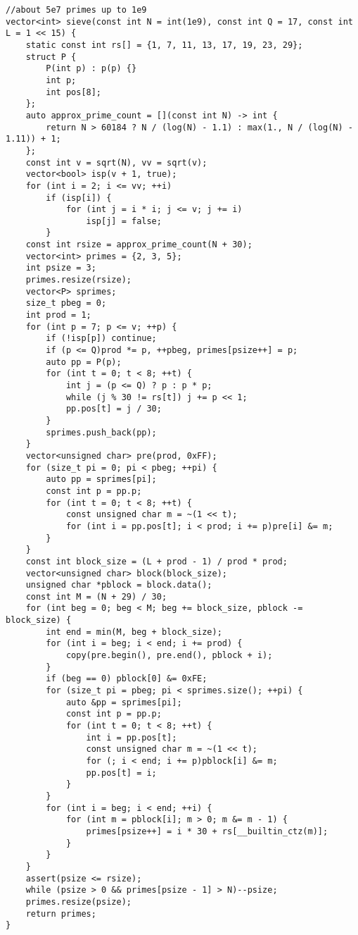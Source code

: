 \begin{lstlisting}[style=cpp]
//about 5e7 primes up to 1e9
vector<int> sieve(const int N = int(1e9), const int Q = 17, const int L = 1 << 15) {
    static const int rs[] = {1, 7, 11, 13, 17, 19, 23, 29};
    struct P {
        P(int p) : p(p) {}
        int p;
        int pos[8];
    };
    auto approx_prime_count = [](const int N) -> int {
        return N > 60184 ? N / (log(N) - 1.1) : max(1., N / (log(N) - 1.11)) + 1;
    };
    const int v = sqrt(N), vv = sqrt(v);
    vector<bool> isp(v + 1, true);
    for (int i = 2; i <= vv; ++i)
        if (isp[i]) {
            for (int j = i * i; j <= v; j += i)
                isp[j] = false;
        }
    const int rsize = approx_prime_count(N + 30);
    vector<int> primes = {2, 3, 5};
    int psize = 3;
    primes.resize(rsize);
    vector<P> sprimes;
    size_t pbeg = 0;
    int prod = 1;
    for (int p = 7; p <= v; ++p) {
        if (!isp[p]) continue;
        if (p <= Q)prod *= p, ++pbeg, primes[psize++] = p;
        auto pp = P(p);
        for (int t = 0; t < 8; ++t) {
            int j = (p <= Q) ? p : p * p;
            while (j % 30 != rs[t]) j += p << 1;
            pp.pos[t] = j / 30;
        }
        sprimes.push_back(pp);
    }
    vector<unsigned char> pre(prod, 0xFF);
    for (size_t pi = 0; pi < pbeg; ++pi) {
        auto pp = sprimes[pi];
        const int p = pp.p;
        for (int t = 0; t < 8; ++t) {
            const unsigned char m = ~(1 << t);
            for (int i = pp.pos[t]; i < prod; i += p)pre[i] &= m;
        }
    }
    const int block_size = (L + prod - 1) / prod * prod;
    vector<unsigned char> block(block_size);
    unsigned char *pblock = block.data();
    const int M = (N + 29) / 30;
    for (int beg = 0; beg < M; beg += block_size, pblock -= block_size) {
        int end = min(M, beg + block_size);
        for (int i = beg; i < end; i += prod) {
            copy(pre.begin(), pre.end(), pblock + i);
        }
        if (beg == 0) pblock[0] &= 0xFE;
        for (size_t pi = pbeg; pi < sprimes.size(); ++pi) {
            auto &pp = sprimes[pi];
            const int p = pp.p;
            for (int t = 0; t < 8; ++t) {
                int i = pp.pos[t];
                const unsigned char m = ~(1 << t);
                for (; i < end; i += p)pblock[i] &= m;
                pp.pos[t] = i;
            }
        }
        for (int i = beg; i < end; ++i) {
            for (int m = pblock[i]; m > 0; m &= m - 1) {
                primes[psize++] = i * 30 + rs[__builtin_ctz(m)];
            }
        }
    }
    assert(psize <= rsize);
    while (psize > 0 && primes[psize - 1] > N)--psize;
    primes.resize(psize);
    return primes;
}
\end{lstlisting}


